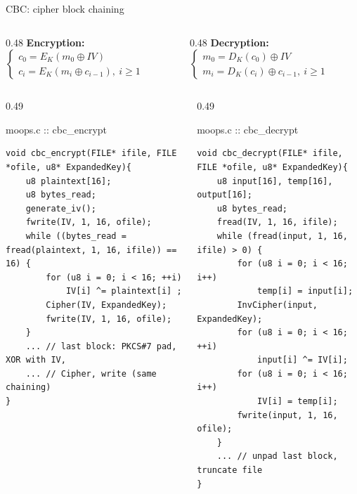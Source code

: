 \documentclass[aspectratio=169,10pt]{beamer}
\newcommand{\xor}{\oplus}
\newcommand{\codesmall}{\lstset{basicstyle=\ttfamily\fontsize{5.5}{6.4}\selectfont}}
\newcommand{\codenormal}{\lstset{basicstyle=\ttfamily\fontsize{5.9}{6.9}\selectfont}}
\begin{document}
\begin{frame}[fragile]{CBC: cipher block chaining}
\begin{columns}[T]
\begin{column}{0.48\textwidth}
\footnotesize
\textbf{Encryption:}
$\begin{cases}c_0=E_K(m_0\xor IV)\\ c_i=E_K(m_i\xor c_{i-1}),\ i\ge1\end{cases}$
\end{column}
\begin{column}{0.48\textwidth}
\footnotesize
\textbf{Decryption:}
$\begin{cases}m_0=D_K(c_0)\xor IV\\ m_i=D_K(c_i)\xor c_{i-1},\ i\ge1\end{cases}$
\end{column}
\end{columns}
\vskip3pt
\codesmall
\begin{columns}[T]
\begin{column}{0.49\textwidth}
\begin{tbox}{moops.c :: cbc\_encrypt}
\begin{lstlisting}
void cbc_encrypt(FILE* ifile, FILE *ofile, u8* ExpandedKey){
    u8 plaintext[16];
    u8 bytes_read;
    generate_iv();
    fwrite(IV, 1, 16, ofile);
    while ((bytes_read = fread(plaintext, 1, 16, ifile)) == 16) {
        for (u8 i = 0; i < 16; ++i)
            IV[i] ^= plaintext[i] ;
        Cipher(IV, ExpandedKey);
        fwrite(IV, 1, 16, ofile);
    }
    ... // last block: PKCS#7 pad, XOR with IV,
    ... // Cipher, write (same chaining)
}
\end{lstlisting}
\end{tbox}
\end{column}
\begin{column}{0.49\textwidth}
\begin{tbox}{moops.c :: cbc\_decrypt}
\begin{lstlisting}
void cbc_decrypt(FILE* ifile, FILE *ofile, u8* ExpandedKey){
    u8 input[16], temp[16], output[16];
    u8 bytes_read;
    fread(IV, 1, 16, ifile);
    while (fread(input, 1, 16, ifile) > 0) {
        for (u8 i = 0; i < 16; i++)
            temp[i] = input[i];
        InvCipher(input, ExpandedKey);
        for (u8 i = 0; i < 16; ++i)
            input[i] ^= IV[i];
        for (u8 i = 0; i < 16; i++)
            IV[i] = temp[i];
        fwrite(input, 1, 16, ofile);
    }
    ... // unpad last block, truncate file
}
\end{lstlisting}
\end{tbox}
\end{column}
\end{columns}
\codenormal
{}
\end{frame}
\end{document}
